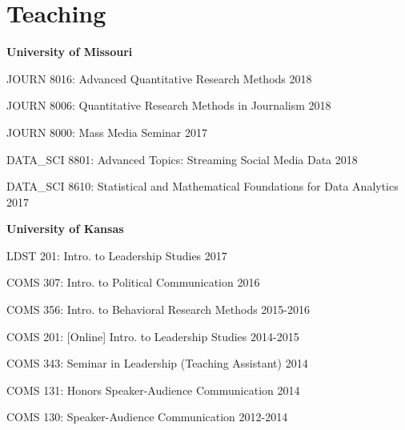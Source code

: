 
\section{Teaching}

  \textbf{University of Missouri}
    \begin{innerlist}
      \item JOURN 8016: Advanced Quantitative Research Methods \hfill 2018
      \item JOURN 8006: Quantitative Research Methods in Journalism \hfill 2018
      \item JOURN 8000: Mass Media Seminar \hfill 2017
      \item DATA\_SCI 8801: Advanced Topics: Streaming Social Media Data \hfill 2018
      \item DATA\_SCI 8610: Statistical and Mathematical Foundations for Data Analytics \hfill 2017
    \end{innerlist}\vspace{1em}

  \textbf{University of Kansas}
    \begin{innerlist}
      \item LDST 201: Intro. to Leadership Studies \hfill 2017
      \item COMS 307: Intro. to Political Communication \hfill 2016
      \item COMS 356: Intro. to Behavioral Research Methods \hfill 2015-2016
      \item COMS 201: {[}Online{]} Intro. to Leadership Studies \hfill 2014-2015
      \item COMS 343: Seminar in Leadership (Teaching Assistant) \hfill 2014
      \item COMS 131: Honors Speaker-Audience Communication \hfill 2014
      \item COMS 130: Speaker-Audience Communication \hfill 2012-2014
    \end{innerlist}\vspace{-.1in}
